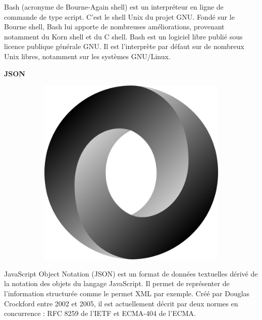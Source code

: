 \documentclass{article}
\begin{document}
Bash (acronyme de Bourne-Again shell) est un interpréteur en ligne de commande de type script. C'est le shell Unix du projet GNU.
Fondé sur le Bourne shell, Bash lui apporte de nombreuses améliorations, provenant notamment du Korn shell et du C shell. Bash est un logiciel libre publié sous licence publique générale GNU. Il est l'interprète par défaut sur de nombreux Unix libres, notamment sur les systèmes GNU/Linux.
\newline

\textbf{JSON}
\newline
\begin{figure}[h!]
	\centering
  	\begin{subfigure}[b]{0.2\linewidth}
	\includegraphics[width=\linewidth]{json.png}
  	\end{subfigure}
\end{figure}

JavaScript Object Notation (JSON) est un format de données textuelles dérivé de la notation des objets du langage JavaScript. Il permet de représenter de l’information structurée comme le permet XML par exemple. Créé par Douglas Crockford entre 2002 et 2005, il est actuellement décrit par deux normes en concurrence : RFC 8259 de l’IETF et ECMA-404 de l'ECMA.
\newline


\newpage
\end{document}

